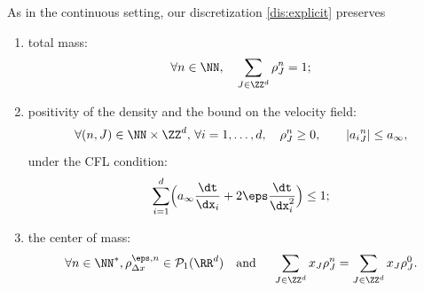 
\begin{lemma}\label{lem:CFL}
As in the continuous setting, our discretization \eqref{dis:explicit} preserves
\begin{enumerate}
\item total mass:
\begin{equation}\label{eq:conservation}
\forall n \in \NN, \quad \sum_{J \in \ZZ^d} \rho_{J}^n=1;
\end{equation}
\item positivity of the density and the bound on the velocity field:
\[
\forall (n,J) \in \NN \times \ZZ^d, \, \forall i=1,\ldots, d, \quad \rho_{J}^n \geq 0, \qquad |{a_i}_{J}^n| \leq a_\infty,
\]
under the CFL condition:
\begin{equation}\label{CFLlarge}
\sum_{i=1}^d \Bigl(a_\infty \frac{\dt}{\dx_i} + 2\eps \frac{\dt}{\dx_i^2}\Bigr) \leq 1;
\end{equation}
\item the center of mass:
\[
\forall n\in \NN^*, \rho_{\Delta x}^{\eps,n} \in \mathcal{P}_1(\RR^d) \quad\text{and }
\quad \sum_{J\in \ZZ^d} x_J \rho_{J}^n = \sum_{J\in \ZZ^d} x_J \rho_{J}^0.
\]
\end{enumerate}
\end{lemma}
